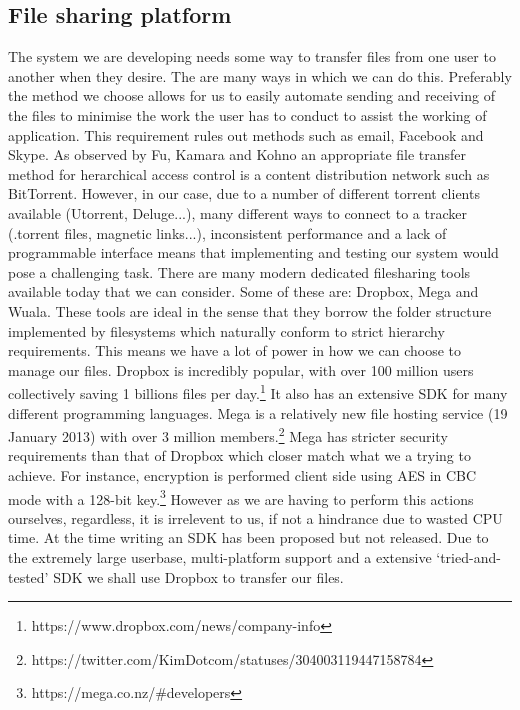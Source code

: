 \documentclass[12pt, titlepage]{article}
\begin{document}
\subsection*{File sharing platform}
The system we are developing needs some way to transfer files from one user to another when they desire. The are many ways in which we can do this. Preferably the method we choose allows for us to easily automate sending and receiving of the files to minimise the work the user has to conduct to assist the working of application. This requirement rules out methods such as email, Facebook and Skype.
\newline \indent As observed by Fu, Kamara and Kohno an appropriate file transfer method for herarchical access control is a content distribution network such as BitTorrent.\cite{bittorrent} However, in our case, due to a number of different torrent clients available (Utorrent, Deluge...), many different ways to connect to a tracker (.torrent files, magnetic links...), inconsistent performance and a lack of programmable interface means that implementing and testing our system would pose a challenging task.
\newline \indent There are many modern dedicated filesharing tools available today that we can consider. Some of these are: Dropbox, Mega and Wuala. These tools are ideal in the sense that they borrow the folder structure implemented by filesystems which naturally conform to strict hierarchy requirements. This means we have a lot of power in how we can choose to manage our files. Dropbox is incredibly popular, with over 100 million users collectively saving 1 billions files per day.\footnote{https://www.dropbox.com/news/company-info} It also has an extensive SDK for many different programming languages. Mega is a relatively new file hosting service (19 January 2013) with over 3 million members.\footnote{https://twitter.com/KimDotcom/statuses/304003119447158784} Mega  has stricter security requirements than that of Dropbox which closer match what we a trying to achieve. For instance, encryption is performed client side using AES in CBC mode with a 128-bit key.\footnote{https://mega.co.nz/\#developers} However as we are having to perform this actions ourselves, regardless, it is irrelevent to us, if not a hindrance due to wasted CPU time. At the time writing an SDK has been proposed but not released.
\newline Due to the extremely large userbase, multi-platform support and a extensive `tried-and-tested' SDK we shall use Dropbox to transfer our files.
\end{document}
